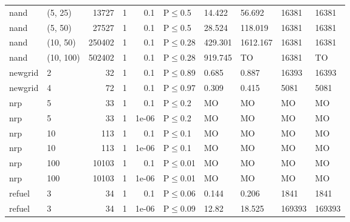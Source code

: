 \begin{longtable}{llrrrlllll}
 nand          & (5, 25)   &  	13727 & 1 & 0.1   & P$\leq$0.5   & 14.422  & 56.692   & 16381  & 16381  \\
 nand          & (5, 50)   &  	27527 & 1 & 0.1   & P$\leq$0.5   & 28.524  & 118.019  & 16381  & 16381  \\
 nand          & (10, 50)  & 	250402 & 1 & 0.1   & P$\leq$0.28  & 429.301 & 1612.167 & 16381  & 16381  \\
 nand          & (10, 100) & 	502402 & 1 & 0.1   & P$\leq$0.28  & 919.745 & TO       & 16381  & TO     \\
 newgrid       & 2         &     	32 & 1 & 0.1   & P$\leq$0.89  & 0.685   & 0.887    & 16393  & 16393  \\
 newgrid       & 4         &     	72 & 1 & 0.1   & P$\leq$0.97  & 0.309   & 0.415    & 5081   & 5081   \\
 nrp           & 5         &     	33 & 1 & 0.1   & P$\leq$0.2   & MO      & MO       & MO     & MO     \\
 nrp           & 5         &     	33 & 1 & 1e-06 & P$\leq$0.2   & MO      & MO       & MO     & MO     \\
 nrp           & 10        &    	113 & 1 & 0.1   & P$\leq$0.1   & MO      & MO       & MO     & MO     \\
 nrp           & 10        &    	113 & 1 & 1e-06 & P$\leq$0.1   & MO      & MO       & MO     & MO     \\
 nrp           & 100       &  	10103 & 1 & 0.1   & P$\leq$0.01  & MO      & MO       & MO     & MO     \\
 nrp           & 100       &  	10103 & 1 & 1e-06 & P$\leq$0.01  & MO      & MO       & MO     & MO     \\
 refuel        & 3         &     	34 & 1 & 0.1   & P$\leq$0.06  & 0.144   & 0.206    & 1841   & 1841   \\
 refuel        & 3         &     	34 & 1 & 1e-06 & P$\leq$0.09  & 12.82   & 18.525   & 169393 & 169393 \\
\bottomrule
\end{longtable}
